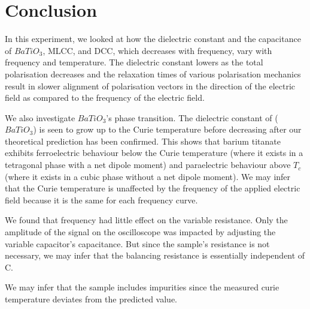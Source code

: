 \section{Conclusion}
	In this experiment, we looked at how the dielectric constant and the capacitance of $BaTiO_3$, MLCC, and DCC, which decreases with frequency, vary with frequency and temperature. The dielectric constant lowers as the total polarisation decreases and the relaxation times of various polarisation mechanics result in slower alignment of polarisation vectors in the direction of the electric field as compared to the frequency of the electric field.
	
	We also investigate $BaTiO_3$'s phase transition. The dielectric constant of ($BaTiO_3$) is seen to grow up to the Curie temperature before decreasing after our theoretical prediction has been confirmed. This shows that barium titanate exhibits ferroelectric behaviour below the Curie temperature (where it exists in a tetragonal phase with a net dipole moment) and paraelectric behaviour above $T_c$ (where it exists in a cubic phase without a net dipole moment). We may infer that the Curie temperature is unaffected by the frequency of the applied electric field because it is the same for each frequency curve.
	
	We found that frequency had little effect on the variable resistance. Only the amplitude of the signal on the oscilloscope was impacted by adjusting the variable capacitor's capacitance. But since the sample's resistance is not necessary, we may infer that the balancing resistance is essentially independent of C.
	
	We may infer that the sample includes impurities since the measured curie temperature deviates from the predicted value.
 